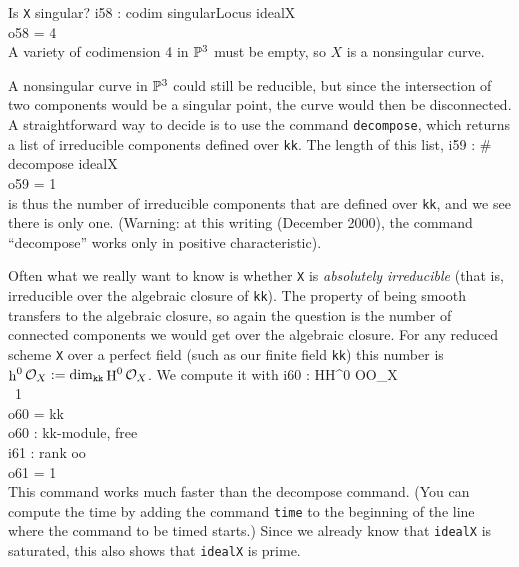 Is {\tt X}
singular?
\beginOutput
i58 : codim singularLocus idealX\\
\emptyLine
o58 = 4\\
\endOutput
%
A variety of codimension 4 in $\P^3$ must be empty, so $X$
is a nonsingular curve. 

A nonsingular curve in $\P^3$ could still be reducible,
but since the intersection of two components
would be a singular point, the curve would then be disconnected.
A straightforward
way to decide is to use the command {\tt decompose},
which returns a list of irreducible components defined over {\tt kk}. 
The length
of this list,
\beginOutput
i59 : # decompose idealX\\
\emptyLine
o59 = 1\\
\endOutput
{}%
%
%
is thus the number of irreducible components
that are defined over {\tt kk}, and
we see there is only one. (Warning: at this writing (December 2000), 
the command
``decompose'' works only in positive characteristic).  

Often what we really want to know is
whether {\tt X} is 
{\it absolutely irreducible\/} (that is, irreducible over the 
algebraic closure of {\tt kk}).
The property of being smooth transfers to the algebraic
closure, so again the question is the number of connected
components we would get over the algebraic closure.
{}For any reduced scheme {\tt X} over a perfect
{}field (such as our finite field {\tt kk}) this number is
$\mathop{\rm h}\nolimits^0\cO_X := \mathop{\rm dim}\nolimits_{\tt kk}\mathop{\rm H}\nolimits^0\cO_X$.
We compute it with
\beginOutput
i60 : HH^0 OO_X\\
\emptyLine
\        1\\
o60 = kk\\
\emptyLine
o60 : kk-module, free\\
\endOutput
\beginOutput
i61 : rank oo\\
\emptyLine
o61 = 1\\
\endOutput
This command works much faster than the decompose command.
(You can compute the time by adding the command {\tt time}
to the beginning of the line where the command to be timed
starts.) Since we already know that {\tt idealX} is saturated,
this also shows that {\tt idealX} is prime.

